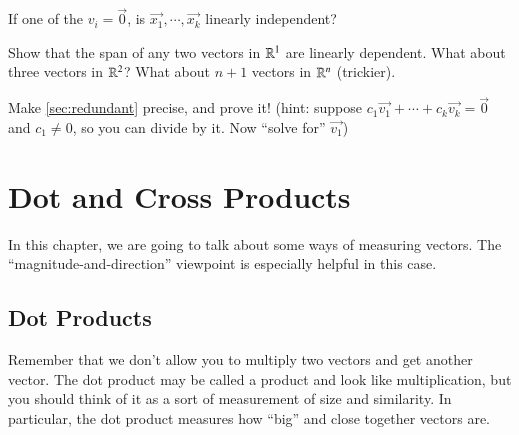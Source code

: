 \documentclass[Main.tex]{subfiles}
\begin{document}
\begin{UnimpEx}
  If one of the $v_i=\vec{0}$, is $\vec{x_1},\cdots,\vec{x_k}$ linearly independent?  
\end{UnimpEx}

\begin{Ex}
  Show that the span of any two vectors in $\mathbb{R}^1$ are linearly dependent.
  What about three vectors in $\mathbb{R}^2$?
  What about $n+1$ vectors in $\mathbb{R}^n$ (trickier).  
\end{Ex}

\begin{ImpEx}
  Make \ref{sec:redundant} precise, and prove it!
  (hint: suppose $c_1\vec{v_1}+\cdots+c_k\vec{v_k} = \vec{0}$ and $c_1\ne 0$, so you can divide by it.  Now ``solve for'' $\vec{v_1}$)
\end{ImpEx}

\exersisesc

\section{Dot and Cross Products}

In this chapter, we are going to talk about some ways of measuring vectors.
The ``magnitude-and-direction'' viewpoint is especially helpful in this case.

\subsection{Dot Products}

Remember that we don't allow you to multiply two vectors and get another vector.
The dot product may be called a product and look like multiplication, but you should think of it as a sort of measurement of size and similarity.
In particular, the dot product measures how ``big'' and close together vectors are.
\end{document}

